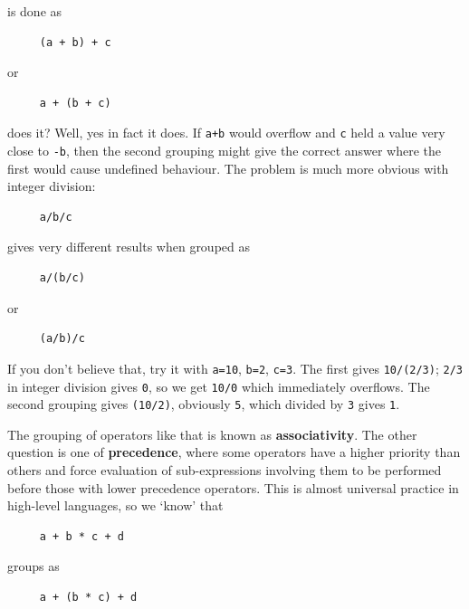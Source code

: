    is done as


   \begin{Verbatim}
     (a + b) + c
   \end{Verbatim}

   or


   \begin{Verbatim}
     a + (b + c)
   \end{Verbatim}

   does it? Well, yes in fact it does. If \texttt{a+b} would
    overflow and \texttt{c} held a value very close
    to \texttt{-b}, then the second grouping might give the correct
    answer where the first would cause undefined behaviour. The problem is
    much more obvious with integer division:


   \begin{Verbatim}
     a/b/c
   \end{Verbatim}

   gives very different results when grouped as


   \begin{Verbatim}
     a/(b/c)
   \end{Verbatim}

   or


   \begin{Verbatim}
     (a/b)/c
   \end{Verbatim}

   If you don't believe that, try it with \texttt{a=10},
    \texttt{b=2}, \texttt{c=3}. The first
    gives \texttt{10/(2/3)}; \texttt{2/3} in integer
    division gives \texttt{0}, so we get \texttt{10/0} which
    immediately overflows. The second grouping gives \texttt{(10/2)},
    obviously \texttt{5}, which divided by \texttt{3}
    gives \texttt{1}.


   The grouping of operators like that is known as
    \textbf{associativity}. The other question is one of
    \textbf{precedence}, where some operators have a higher priority than
    others and force evaluation of sub-expressions involving them to be
    performed before those with lower precedence operators. This is almost
    universal practice in high-level languages, so we `know' that


   \begin{Verbatim}
     a + b * c + d
   \end{Verbatim}

   groups as


   \begin{Verbatim}
     a + (b * c) + d
   \end{Verbatim}

